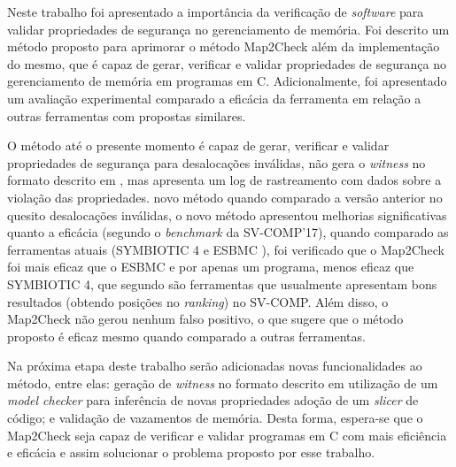 \label{chapter:consideracoes}

Neste trabalho foi apresentado a importância da verificação de \textit{software} para validar propriedades de segurança no gerenciamento de memória. Foi descrito um método proposto para aprimorar o método Map2Check além da implementação do mesmo, que é capaz de gerar, verificar e validar propriedades de segurança no gerenciamento de memória em programas em C. Adicionalmente, foi apresentado um avaliação experimental comparado a eficácia da ferramenta em relação a outras ferramentas com propostas similares. 
\par
O método até o presente momento é capaz de gerar, verificar e validar propriedades de segurança para desalocações inválidas, não gera o \textit{witness} no formato descrito em , mas apresenta um log de rastreamento  
com dados sobre a violação das propriedades. 
 novo método quando comparado a versão anterior no quesito desalocações inválidas, o novo método apresentou melhorias significativas quanto a eficácia (segundo o \textit{benchmark} da SV-COMP'17), quando comparado as ferramentas atuais (SYMBIOTIC 4 \cite{Chalupa:2016} e ESBMC \cite{Cordeiro:2012} ), foi verificado que o Map2Check foi mais eficaz que o ESBMC e por apenas um programa, menos eficaz que SYMBIOTIC 4, que segundo  são ferramentas que usualmente apresentam bons resultados (obtendo posições no \textit{ranking}) no SV-COMP. Além disso, o Map2Check não gerou nenhum falso positivo, o que sugere que o método proposto é eficaz mesmo quando comparado a outras ferramentas.  
 
 \par
Na próxima etapa deste trabalho serão adicionadas novas funcionalidades ao método, entre elas: geração de \textit{witness} no formato descrito em  utilização de um \textit{model checker} para inferência de novas propriedades adoção de um \textit{slicer} de código; e 
validação de vazamentos de memória. 
Desta forma, espera-se que o Map2Check seja capaz de verificar e validar programas em C com mais eficiência e eficácia e assim solucionar o problema proposto por esse trabalho.  
